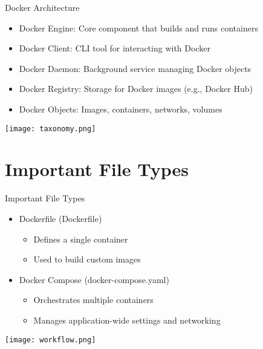 \documentclass{beamer}
\begin{document}
\begin{frame}{Docker Architecture}
    \begin{minipage}[t][0.6\textheight][t]{\textwidth}
        \begin{itemize}
            \item Docker Engine: Core component that builds and runs containers
            \item Docker Client: CLI tool for interacting with Docker
            \item Docker Daemon: Background service managing Docker objects
            \item Docker Registry: Storage for Docker images (e.g., Docker Hub)
            \item Docker Objects: Images, containers, networks, volumes
        \end{itemize}
    \end{minipage}

    \vspace{-50pt} 

    \begin{center}
        \texttt{[image: taxonomy.png]}
    \end{center}
\end{frame}

\section{Important File Types}

\begin{frame}{Important File Types}
    \begin{minipage}[t][0.6\textheight][t]{\textwidth}
        \begin{itemize}
            \item Dockerfile (Dockerfile)
            \begin{itemize}
                \item Defines a single container
                \item Used to build custom images
            \end{itemize}
            \item Docker Compose (docker-compose.yaml)
            \begin{itemize}
                \item Orchestrates multiple containers
                \item Manages application-wide settings and networking
            \end{itemize}
        \end{itemize}
    \end{minipage}

    \vspace{-55pt}

    \begin{center}
        \texttt{[image: workflow.png]}
    \end{center}
\end{frame}
\end{document}
